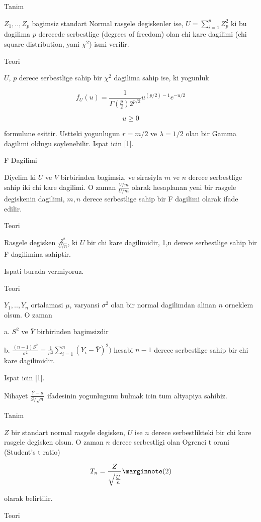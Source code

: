 \documentclass[12pt,fleqn]{article}\usepackage{../common}
\begin{document}
Tanim

$Z_1, .. , Z_p$ bagimsiz standart Normal rasgele degiskenler ise, $U = \sum
_{ i=1}^{p} Z_p^2$ 
ki bu dagilima $p$ derecede serbestlige (degrees of freedom) olan chi kare
dagilimi (chi square distribution, yani $\chi^2$) ismi verilir.

Teori

$U$, $p$ derece serbestlige sahip bir $\chi^2$ dagilima sahip ise, ki yogunluk 

$$ f_U(u) = \frac{ 1}{\Gamma(\frac{p}{2}) 2^{p/2}} u^{(p/2) - 1} e^{-u/2
} $$

$$ u \ge 0 $$

formulune esittir. Ustteki yogunlugun $r=m/2$ ve $\lambda=1/2$ olan bir
Gamma dagilimi oldugu soylenebilir. Ispat icin [1].

F Dagilimi

Diyelim ki $U$ ve $V$ birbirinden bagimsiz, ve sirasiyla $m$ ve $n$ derece
serbestlige sahip iki chi kare dagilimi. O zaman $\frac{V/m}{U/m}$ olarak
hesaplanan yeni bir rasgele degiskenin dagilimi, $m,n$ derece serbestlige
sahip bir F dagilimi olarak ifade edilir.

Teori

Rasgele degisken $\frac{Z^2}{U/n}$, ki $U$ bir chi kare dagilimidir, 1,n
derece serbestlige sahip bir F dagilimina sahiptir. 

Ispati burada vermiyoruz.

Teori

$Y_1,..,Y_n$ ortalamasi $\mu$, varyansi $\sigma^2$ olan bir normal dagilimdan alinan $n$ 
orneklem olsun. O zaman 

a. $S^2$ ve $\bar{Y}$ birbirinden bagimsizdir

b. $\frac{(n-1)S^2}{\sigma^2} =
\frac{1}{\sigma^2}\sum_{i=1}^{n}(Y_i-\bar{Y})^2)$ hesabi $n-1$ derece
serbestlige sahip bir chi kare dagilimidir.

Ispat icin [1].

Nihayet  $\frac{\bar{Y}-\mu}{S / \sqrt{n}}$ ifadesinin yogunlugunu bulmak icin tum altyapiya sahibiz. 

Tanim

$Z$ bir standart normal rasgele degisken, $U$ ise $n$ derece serbestlikteki
bir chi kare rasgele degisken olsun. O zaman $n$ derece serbestligi olan
Ogrenci t orani (Student's t ratio)

$$ T_n = \frac{Z}{\sqrt{ \frac{U}{n}}} \mlabel{2} $$

olarak belirtilir.

Teori
\end{document}

